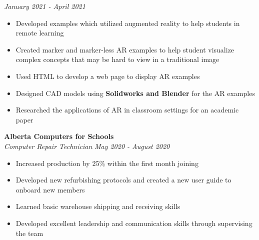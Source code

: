 \documentclass[a4paper,20pt]{article}
\begin{document}
        \textit{January 2021 - April 2021} \\
        \vspace{-18pt} 
        \hspace{-3pt}
        \begin{itemize}
            \item Developed examples which utilized augmented reality to help students in remote learning \vspace{-5pt}
            \item Created marker and marker-less AR examples to help student visualize complex concepts that may be hard to view in a traditional image \vspace{-5pt}
            \item Used HTML to develop a web page to display AR examples \vspace{-5pt}
            \item Designed CAD models using \textbf{Solidworks and Blender} for the AR examples  \vspace{-5pt}
            \item Researched the applications of AR in classroom settings for an academic paper
        \end{itemize}        

    \vspace{-1pt}
            \textbf{Alberta Computers for Schools}\hspace{3cm}
            \textit{}\\
            \textit{Computer Repair Technician}\hspace{9.9 cm}
            \textit{May 2020 - August 2020} \\
            \vspace{-18pt} 
            \hspace{-3pt}
            \begin{itemize}
                \item Increased production by 25\% within the first month joining \vspace{-5pt}
                \item Developed new refurbishing protocols and created a new user guide to onboard new members \vspace{-5pt}
                \item Learned basic warehouse shipping and receiving skills \vspace{-5pt}
                \item Developed excellent leadership and communication skills through supervising the team 
            \end{itemize}    
\end{document}
